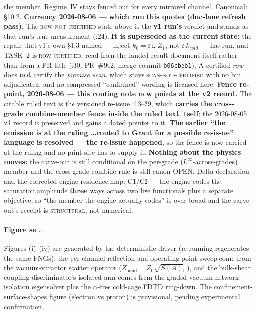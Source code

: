 the member. Regime~IV stays fenced out for every mirrored channel. Canonical:  \S10.2. \textbf{Currency 2026-08-06 --- which run this quotes (doc-lane refresh pass).} The \textsc{row-not-certified} state above is the \textbf{v1 run's} verdict and stands as that run's true measurement (:24). \textbf{It is superseded as the current state:} the repair that v1's own \S1.3 named --- inject $k_0 = \varepsilon\,\omega\,Z_1$, not $\varepsilon\,k_{cold}$ --- has run, and TASK~2 is \textsc{row-certified}, read from the landed result document itself rather than from a PR title (:30; PR~\#902, merge commit \texttt{b06cbeb1}). A certified \emph{row} does \textbf{not} certify the \emph{premise scan}, which stays \textsc{scan-not-certified} with no bin adjudicated, and no compressed ``confirmed'' wording is licensed here. \textbf{Fence re-point, 2026-08-06 --- this routing note now points at the v2 record.} The citable ruled text is the versioned re-issue :13--29, which \textbf{carries the cross-grade combine-member fence inside the ruled text itself}; the 2026-08-05 v1 record is preserved and gains a dated pointer to it. \textbf{The earlier ``the omission is at the ruling \ldots routed to Grant for a possible re-issue'' language is resolved --- the re-issue happened}, so the fence is now carried at the ruling and no print site has to supply it. \textbf{Nothing about the physics moves:} the carve-out is still conditional on the per-grade ($L^\infty$-across-grades) member and the cross-grade combine rule is still canon-OPEN. Delta declaration and the corrected engine-residence map:  C1/C2 --- the engine codes the saturation amplitude \textbf{three} ways across two live functionals plus a separate objective, so ``the member the engine actually codes'' is over-broad and the carve-out's receipt is \textsc{structural}, not numerical.

\paragraph{Figure set.}
Figures (i)--(iv) are generated by the deterministic driver \texttt{} (re-running regenerates the same PNGs): the per-channel reflection and operating-point sweep come from the vacuum-varactor scatter operator ($Z_{\mathrm{bond}}=Z_0\sqrt{S(A)}$, ), and the bulk-shear coupling discriminator's isolated arm comes from the graded-vacuum-network isolation eigensolver plus the $\alpha$-free cold-cage FDTD ring-down. The confinement-surface-shapes figure (electron vs proton) is provisional, pending experimental confirmation.

